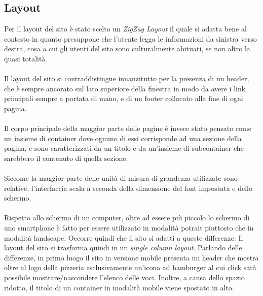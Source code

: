 \subsection{Layout}
Per il layout del sito è stato scelto un \textit{ZigZag Layout} il quale si adatta bene al contesto in
quanto presuppone che l'utente legga le informazioni da sinistra verso destra, cosa a cui gli utenti
del sito sono culturalmente abituati, se non altro la quasi totalità.\\
\\
Il layout del sito si contraddistingue innanzitutto per la presenza di un header, che è sempre ancorato
sul lato superiore della finestra in modo da avere i link principali sempre a portata di mano, e di un
footer collocato alla fine di ogni pagina.\\
\\
Il corpo principale della maggior parte delle pagine è invece stato pensato come un insieme di
container dove ognuno di essi corrisponde ad una sezione della pagina, e sono caratterizzati da un titolo
e da un'insieme di subcontainer che sarebbero il contenuto di quella sezione.\\
\\
Siccome la maggior parte delle unità di misura di grandezza utilizzate sono relative, l'interfaccia scala
a seconda della dimensione del font impostata e dello schermo.\\
\\
Rispetto allo schermo di un computer, oltre ad essere più piccolo lo schermo di uno smartphone è
fatto per essere utilizzato in modalità potrait piuttosto che in modalità landscape. Occorre quindi che
il sito si adatti a queste differenze. Il layout del sito si trasforma quindi in un \textit{single
column layout}. Parlando delle differenze, in primo luogo il sito in versione mobile presenta un header
che mostra oltre al logo della pizzeria esclusivamente un'icona ad hamburger al cui click sarà possibile
mostrare/nascondere l'elenco delle voci. Inoltre, a causa dello spazio ridotto, il titolo di un
container in modalità mobile viene spostato in alto.
\newpage
